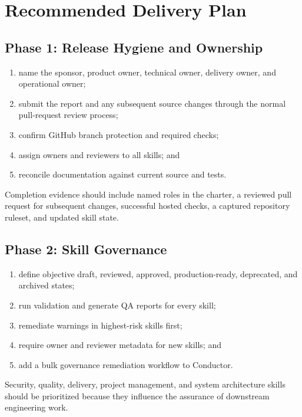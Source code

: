 \documentclass[12pt]{report}
\begin{document}
\section{Recommended Delivery Plan}

\subsection{Phase 1: Release Hygiene and Ownership}

\begin{enumerate}
  \item name the sponsor, product owner, technical owner, delivery owner, and operational owner;
  \item submit the report and any subsequent source changes through the normal pull-request review process;
  \item confirm GitHub branch protection and required checks;
  \item assign owners and reviewers to all skills; and
  \item reconcile documentation against current source and tests.
\end{enumerate}

Completion evidence should include named roles in the charter, a reviewed pull request for subsequent changes, successful hosted checks, a captured repository ruleset, and updated skill state.

\subsection{Phase 2: Skill Governance}

\begin{enumerate}
  \item define objective draft, reviewed, approved, production-ready, deprecated, and archived states;
  \item run validation and generate QA reports for every skill;
  \item remediate warnings in highest-risk skills first;
  \item require owner and reviewer metadata for new skills; and
  \item add a bulk governance remediation workflow to Conductor.
\end{enumerate}

Security, quality, delivery, project management, and system architecture skills should be prioritized because they influence the assurance of downstream engineering work.
\end{document}
